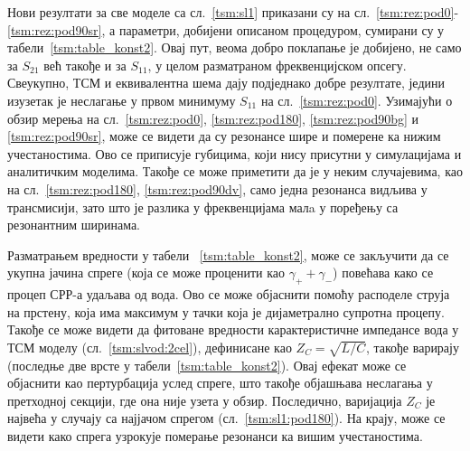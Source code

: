 \documentclass[main.tex]{subfiles}
\begin{document}
Нови резултати за све моделе са сл.~\ref{tsm:sl1} приказани су на сл.~\ref{tsm:rez:pod0}-\ref{tsm:rez:pod90sr}, а параметри, добијени описаном процедуром, сумирани су у табели~\ref{tsm:table_konst2}. Овај пут, веома добро поклапање је добијено, не само за $S_{21}$ већ такође и за $S_{11}$, у целом разматраном фреквенцијском опсегу. Свеукупно, ТСМ и еквивалентна шема дају подједнако добре резултате, једини изузетак је неслагање у првом минимуму $S_{11}$ на сл.~\ref{tsm:rez:pod0}. Узимајући о обзир мерења на сл.~\ref{tsm:rez:pod0}, \ref{tsm:rez:pod180}, \ref{tsm:rez:pod90bg} и \ref{tsm:rez:pod90sr}, може се видети да су резонансе шире и померене ка нижим учестаностима. Ово се приписује губицима, који нису присутни у симулацијама и аналитичким моделима. Такође се може приметити да је у неким случајевима, као на сл.~\ref{tsm:rez:pod180}, \ref{tsm:rez:pod90dv}, само једна резонанса видљива у трансмисији, зато што је разлика у фреквенцијама малa у поређењу са резонантним ширинама.

Разматрањем вредности у табели ~\ref{tsm:table_konst2}, може се закључити да се укупна јачина спреге (која се може проценити као $\gamma_+ + \gamma_-$) повећава како се процеп СРР-а удаљава од вода. Ово се може објаснити помоћу расподеле струја на прстену, која има максимум у тачки која је дијаметрално супротна процепу. Такође се може видети да фитоване вредности карактеристичне импедансе вода у ТСМ моделу (сл.~\ref{tsm:slvod:2cel}), дефинисане као $Z_C = \sqrt{L/C}$, такође варирају (последње две врсте у табели~\ref{tsm:table_konst2}). Овај ефекат може се објаснити као пертурбација услед спреге, што такође објашњава неслагања у претходној секцији, где она није узета у обзир. Последично, варијација $Z_C$ је највећа у случају са најјачом спрегом (сл.~\ref{tsm:sl1:pod180}). На крају, може се видети како спрега узрокује померање резонанси ка вишим учестаностима.
\end{document}
